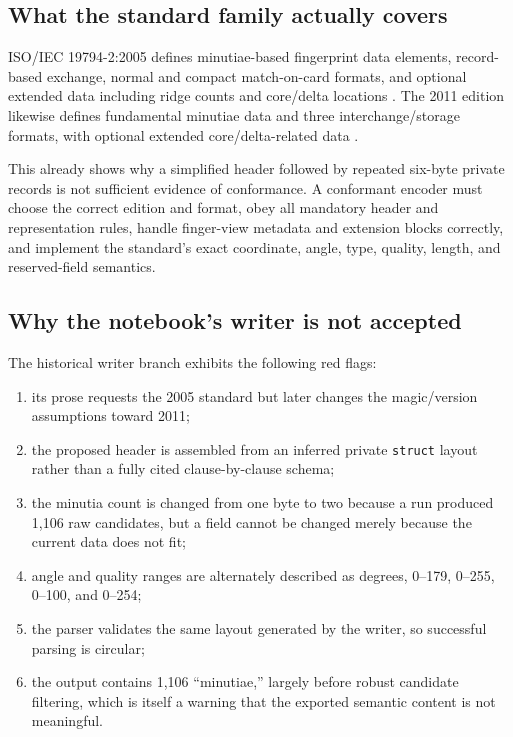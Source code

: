 \documentclass[11pt]{article}
\begin{document}
\subsection{What the standard family actually covers}

ISO/IEC 19794-2:2005 defines minutiae-based fingerprint data elements, record-based exchange, normal and compact match-on-card formats, and optional extended data including ridge counts and core/delta locations \cite{iso1979422005}. The 2011 edition likewise defines fundamental minutiae data and three interchange/storage formats, with optional extended core/delta-related data \cite{iso1979422011}.

This already shows why a simplified header followed by repeated six-byte private records is not sufficient evidence of conformance. A conformant encoder must choose the correct edition and format, obey all mandatory header and representation rules, handle finger-view metadata and extension blocks correctly, and implement the standard's exact coordinate, angle, type, quality, length, and reserved-field semantics.

\subsection{Why the notebook's writer is not accepted}

The historical writer branch exhibits the following red flags:

\begin{enumerate}
  \item its prose requests the 2005 standard but later changes the magic/version assumptions toward 2011;
  \item the proposed header is assembled from an inferred private \texttt{struct} layout rather than a fully cited clause-by-clause schema;
  \item the minutia count is changed from one byte to two because a run produced 1,106 raw candidates, but a field cannot be changed merely because the current data does not fit;
  \item angle and quality ranges are alternately described as degrees, 0--179, 0--255, 0--100, and 0--254;
  \item the parser validates the same layout generated by the writer, so successful parsing is circular;
  \item the output contains 1,106 ``minutiae,'' largely before robust candidate filtering, which is itself a warning that the exported semantic content is not meaningful.
\end{enumerate}
\end{document}
